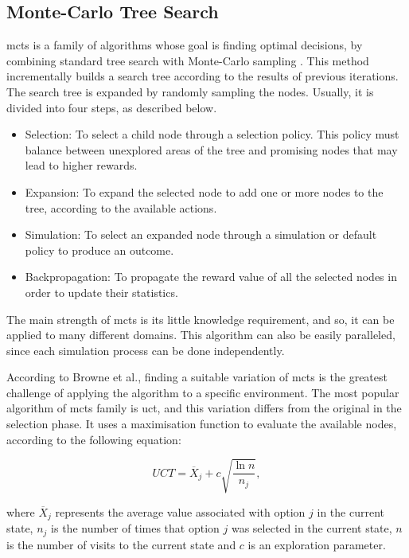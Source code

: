 \subsection{Monte-Carlo Tree Search}


\ac{mcts} is a family of algorithms whose goal is finding optimal decisions, by combining standard tree search with Monte-Carlo sampling \cite{Browne2012}.
This method incrementally builds a search tree according to the results of previous iterations.
The search tree is expanded by randomly sampling the nodes.
Usually, it is divided into four steps, as described below.
\begin{itemize}
  \item Selection: To select a child node through a selection policy. This policy must balance between unexplored areas of the tree and promising nodes that may lead to higher rewards.
  \item Expansion: To expand the selected node to add one or more nodes to the tree, according to the available actions.
  \item Simulation: To select an expanded node through a simulation or default policy to produce an outcome.
  \item Backpropagation: To propagate the reward value of all the selected nodes in order to update their statistics.
\end{itemize}


The main strength of \ac{mcts} is its little knowledge requirement, and so, it can be applied to many different domains.
This algorithm can also be easily paralleled, since each simulation process can be done independently.


According to Browne et al., finding a suitable variation of \ac{mcts} is the greatest challenge of applying the algorithm to a specific environment.
The most popular algorithm of \ac{mcts} family is \ac{uct}, and this variation differs from the original in the selection phase.
It uses a maximisation function to evaluate the available nodes, according to the following equation:

\begin{equation}
    UCT = \overline{X}_j + c\sqrt{\frac{\ln n}{n_j}},
\end{equation}

where $\overline{X}_j$ represents the average value associated with option $j$ in the current state, $n_j$ is the number of times that option $j$ was selected in the current state, $n$ is the number of visits to the current state and $c$ is an exploration parameter.

